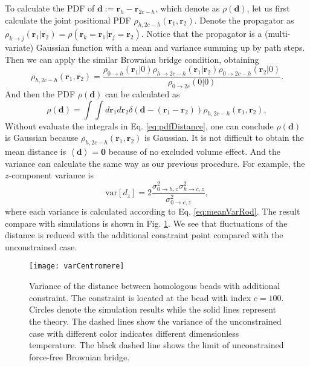 To calculate the PDF of $\mathbf{d} := \mathbf{r}_h - \mathbf{r}_{2c-h}$, which denote as $\rho(\mathbf{d})$, let us first calculate the joint positional PDF $\rho_{h, 2c-h}(\mathbf{r}_1, \mathbf{r}_2)$. Denote the propagator as $\rho_{k\rightarrow j}(\mathbf{r}_1 | \mathbf{r}_2) = \rho(\mathbf{r}_k = \mathbf{r}_1 | \mathbf{r}_j = \mathbf{r}_2)$. Notice that the propagator is a (multi-variate) Gaussian function with a mean and variance summing up by path steps. Then we can apply the similar Brownian bridge condition, obtaining
\begin{equation}
    \label{eq:jointPdfDistance}
    \rho_{h,2c-h}(\mathbf{r}_1, \mathbf{r}_2) = \frac{\rho_{0\rightarrow h}(\mathbf{r}_1|0)\rho_{h\rightarrow 2c-h}(\mathbf{r}_1|\mathbf{r}_2)\rho_{0\rightarrow 2c-h}(\mathbf{r}_2|0)}{\rho_{0\rightarrow 2c}(0|0)}.
\end{equation}
And then the PDF $\rho(\mathbf{d})$ can be calculated as 
\begin{equation}
    \label{eq:pdfDistance}
    \rho(\mathbf{d}) = \int\int d\mathbf{r}_1 d\mathbf{r}_2 \delta(\mathbf{d} - (\mathbf{r}_1 - \mathbf{r}_2))\rho_{h, 2c-h}(\mathbf{r}_1, \mathbf{r}_2),
\end{equation}
Without evaluate the integrals in Eq. \eqref{eq:pdfDistance}, one can conclude $\rho(\mathbf{d})$ is Gaussian because $\rho_{h,2c-h}(\mathbf{r}_1, \mathbf{r}_2)$ is Gaussian. It is not difficult to obtain the mean distance is $\left<\mathbf{d}\right>=\mathbf{0}$ because of no excluded volume effect. And the variance can calculate the same way as our previous procedure. For example, the $z$-component variance is
\begin{equation}
    \label{eq:zvarDistance}
    \text{var}\left[ d_z \right] = 2 \frac{\sigma_{0\rightarrow h,z}^2\sigma_{h\rightarrow c,z}^2}{\sigma_{0\rightarrow c,z}^2}, 
\end{equation}
where each variance is calculated according to Eq. \eqref{eq:meanVarRod}. The result compare with simulations is shown in Fig. \ref{fig:varCentromere}. We see that fluctuations of the distance is reduced with the additional constraint point compared with the unconstrained case. 
\begin{figure}[htpb]
    \centering
    \texttt{[image: varCentromere]}
    \caption{Variance of the distance between homologous beads with additional constraint. The constraint is located at the bead with index $c=100$. Circles denote the simulation results while the solid lines represent the theory. The dashed lines show the variance of the unconstrained case with different color indicates different dimensionless temperature. The black dashed line shows the limit of unconstrained force-free Brownian bridge.}
    \label{fig:varCentromere}
\end{figure}

